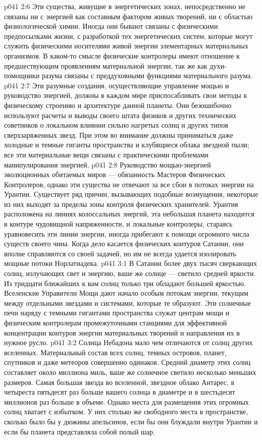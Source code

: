 \vs p041 2:6 \pc Эти существа, живущие в энергетических зонах, непосредственно не связаны ни с энергией как составным фактором живых творений, ни с областью физиологической химии. Иногда они бывают связаны с физическими предпосылками жизни, с разработкой тех энергетических систем, которые могут служить физическими носителями живой энергии элементарных материальных организмов. В каком\hyp{}то смысле физические контролеры имеют отношение к предшествующим проявлениям материальной энергии, так же как духи\hyp{}помощники разума связаны с преддуховными функциями материального разума.
\vs p041 2:7 \pc Эти разумные создания, осуществляющие управление мощью и руководство энергией, должны в каждом мире приспосабливать свои методы к физическому строению и архитектуре данной планеты. Они безошибочно используют расчеты и выводы своего штата физиков и других технических советников о локальном влиянии сильно нагретых солнц и других типов сверхзаряженных звезд. При этом во внимание должны приниматься даже холодные и темные гиганты пространства и клубящиеся облака звездной пыли; все эти материальные вещи связаны с практическими проблемами манипулирования энергией.
\vs p041 2:8 Руководство мощью\hyp{}энергией эволюционных обитаемых миров --- обязанность Мастеров Физических Контролеров, однако эти существа не отвечают за все сбои в потоках энергии на Урантии. Существует ряд причин, вызывающих подобные возмущения, некоторые из них выходят за пределы зоны контроля физических хранителей. Урантия расположена на линиях колоссальных энергий, эта небольшая планета находится в контуре чудовищной напряженности, и локальные контролеры, стараясь уравновесить эти линии энергии, иногда прибегают к помощи огромного числа существ своего чина. Когда дело касается физических контуров Сатании, они вполне справляются со своей задачей, но им не всегда удается изолировать мощные потоки Норлатиадека.
\vs p041 3:1 В Сатании более двух тысяч сверкающих солнц, излучающих свет и энергию, ваше же солнце --- светило средней яркости. Из тридцати ближайших к вам солнц только три обладают большей яркостью. Вселенские Управители Мощи дают начало особым потокам энергии, текущим между отдельными звездами и системами, которые те образуют. Эти солнечные печи наряду с темными гигантами пространства служат центрам мощи и физическим контролерам промежуточными станциями для эффективной концентрации контуров энергии материальных творений и направления их в нужное русло.
\vs p041 3:2 Солнца Небадона мало чем отличаются от солнц других вселенных. Материальный состав всех солнц, темных островов, планет, спутников и даже метеоров совершенно одинаков. Средний диаметр этих солнц составляет около миллиона миль, ваше же солнечное светило несколько меньших размеров. Самая большая звезда во вселенной, звездное облако Антарес, в четыреста пятьдесят раз больше вашего солнца в диаметре и в шестьдесят миллионов раз больше в объеме. Однако места для размещения этих огромных солнц хватает с избытком. У них столько же свободного места в пространстве, сколько было бы у дюжины апельсинов, если бы они блуждали внутри Урантии и если бы планета представляла собой полый шар.

